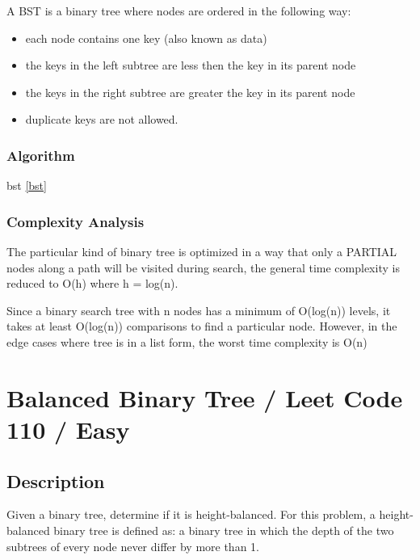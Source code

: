 \documentclass[]{book}
\providecommand{\tightlist}{%
  \setlength{\itemsep}{0pt}\setlength{\parskip}{0pt}}
\begin{document}
A BST is a binary tree where nodes are ordered in the following way:

\begin{itemize}
\tightlist
\item
  each node contains one key (also known as data)
\item
  the keys in the left subtree are less then the key in its parent node
\item
  the keys in the right subtree are greater the key in its parent node
\item
  duplicate keys are not allowed.
\end{itemize}

\hypertarget{algorithm-58}{%
\subsubsection{Algorithm}\label{algorithm-58}}

bst \ref{bst}

\hypertarget{complexity-analysis-2}{%
\subsubsection{Complexity Analysis}\label{complexity-analysis-2}}

The particular kind of binary tree is optimized in a way that only a PARTIAL nodes along a path will be visited during
search, the general time complexity is reduced to O(h) where h = log(n).

Since a binary search tree with n nodes has a minimum of O(log(n)) levels, it takes at least O(log(n)) comparisons to
find a particular node. However, in the edge cases where tree is in a list form, the worst time complexity is O(n)

\hypertarget{balanced-binary-tree-leet-code-110-easy}{%
\section{Balanced Binary Tree / Leet Code 110 / Easy}\label{balanced-binary-tree-leet-code-110-easy}}

\hypertarget{description-51}{%
\subsection{Description}\label{description-51}}

Given a binary tree, determine if it is height-balanced. For this problem, a height-balanced binary tree is defined
as: a binary tree in which the depth of the two subtrees of every node never differ by more than 1.
\end{document}
